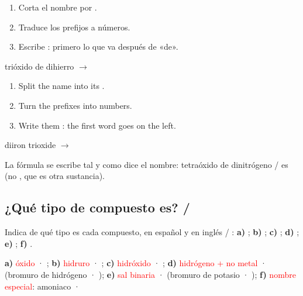 \begin{reglas}
    \begin{enumerate}[label=\numberballgreen]
        \item Corta el nombre por .
        \item Traduce los prefijos a números.
        \item Escribe : primero lo que va después de «de».
    \end{enumerate}
    trióxido de dihierro \(\to\) 
    \ingles
    \begin{enumerate}[label=\numberballgreen]
        \item Split the name into its .
        \item Turn the prefixes into numbers.
        \item Write them : the first word goes on the left.
    \end{enumerate}
    diiron trioxide \(\to\) 
\end{reglas}



\begin{marker}
     La fórmula se escribe tal y como dice el nombre: tetraóxido de dinitrógeno /  es  (no , que es otra sustancia).
\end{marker}

\subsection{¿Qué tipo de compuesto es? / }



\begin{exercise}
    Indica de qué tipo es cada compuesto, en español y en inglés / : \textbf{a)} ; \textbf{b)} ; \textbf{c)} ; \textbf{d)} ; \textbf{e)} ; \textbf{f)} .
    \begin{solu}
        \textbf{a)} \textcolor{red}{óxido} · \textcolor{red}{}; \textbf{b)} \textcolor{red}{hidruro} · \textcolor{red}{}; \textbf{c)} \textcolor{red}{hidróxido} · \textcolor{red}{}; \textbf{d)} \textcolor{red}{hidrógeno + no metal} · \textcolor{red}{} (bromuro de hidrógeno · ); \textbf{e)} \textcolor{red}{sal binaria} · \textcolor{red}{} (bromuro de potasio · ); \textbf{f)} \textcolor{red}{nombre especial}: amoniaco · 
    \end{solu}
\end{exercise}

